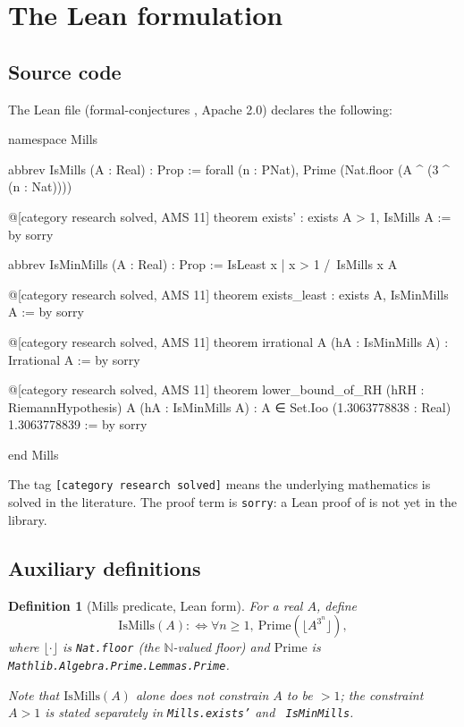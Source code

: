 \documentclass[11pt,reqno]{amsart}
\providecommand{\N}{\mathbb{N}}
\theoremstyle{redplain}
\newtheorem{definition}{Definition}[section]
\numberwithin{equation}{section}
\begin{document}

\section{The Lean formulation}

\label{sec:lean}

\subsection{Source code}

\label{sec:lean-source}

The Lean file 
(formal-conjectures \cite{FormalConjectures}, Apache 2.0) declares the
following:

\begin{verbatimbox}
namespace Mills

abbrev IsMills (A : Real) : Prop :=
  forall (n : PNat), Prime (Nat.floor (A ^ (3 ^ (n : Nat))))

@[category research solved, AMS 11]
theorem exists' : exists A > 1, IsMills A := by sorry

abbrev IsMinMills (A : Real) : Prop :=
  IsLeast {x | x > 1 /\ IsMills x} A

@[category research solved, AMS 11]
theorem exists_least : exists A, IsMinMills A := by sorry

@[category research solved, AMS 11]
theorem irrational {A} (hA : IsMinMills A) : Irrational A := by sorry

@[category research solved, AMS 11]
theorem lower_bound_of_RH (hRH : RiemannHypothesis) {A} (hA : IsMinMills A) :
    A ∈ Set.Ioo (1.3063778838 : Real) 1.3063778839 := by sorry

end Mills
\end{verbatimbox}

\noindent The tag \texttt{[category research solved]} means the underlying
mathematics is solved in the literature. The proof term is \texttt{sorry}: a
Lean proof of  is not yet in the library.

\subsection{Auxiliary definitions}

\label{sec:lean-defs}

\begin{definition}[Mills predicate, Lean form]
\label{def:lean-ismills} For a real $A$, define 
\begin{equation*}
\mathrm{IsMills}(A):\iff \forall n\geq 1,\ \mathrm{Prime}(\lfloor
A^{3^{n}}\rfloor ),
\end{equation*}%
where $\lfloor \cdot \rfloor $ is \texttt{Nat.floor} (the $\N$-valued floor)
and $\mathrm{Prime}$ is \texttt{Mathlib.Algebra.Prime.Lemmas.Prime}.

Note that $\mathrm{IsMills}(A)$ alone does not constrain $A$ to be $>1$; the
constraint $A>1$ is stated separately in \texttt{Mills.exists'} and \texttt{%
IsMinMills}.
\end{definition}
\end{document}
